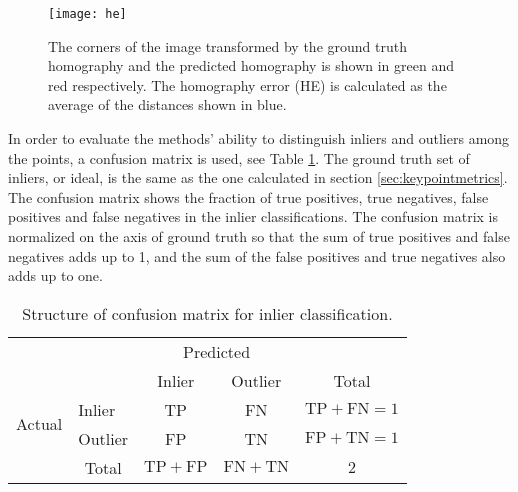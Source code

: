 \begin{figure}[H]
	\centering
	\texttt{[image: he]}
	\caption{The corners of the image transformed by the ground truth homography and the predicted homography is shown in green and red respectively. The homography error (HE) is calculated as the average of the distances shown in blue.}
	\label{fig:he}
\end{figure}

In order to evaluate the methods' ability to distinguish inliers and outliers among the points, a confusion matrix is used, see Table \ref{table:confusion}. The ground truth set of inliers, or ideal, is the same as the one calculated in section \ref{sec:keypointmetrics}. The confusion matrix shows the fraction of true positives, true negatives, false positives and false negatives in the inlier classifications. The confusion matrix is normalized on the axis of ground truth so that the sum of true positives and false negatives adds up to 1, and the sum of the false positives and true negatives also adds up to one.

\begin{table}[H]
	\centering
	\begin{tabular}{l|l|c|c|c}
		\multicolumn{2}{c}{}&\multicolumn{2}{c}{Predicted}&\\
		\cline{3-4}
		\multicolumn{2}{c|}{}&Inlier&Outlier&\multicolumn{1}{c}{Total}\\
		\cline{2-4}
		\multirow{2}{*}{Actual}& Inlier & TP & FN & $\mathrm{TP}+\mathrm{FN}=1$\\
		\cline{2-4}
		& Outlier & FP & TN & $\mathrm{FP}+\mathrm{TN}=1$\\
		\cline{2-4}
		\multicolumn{1}{c}{} & \multicolumn{1}{c}{Total} & \multicolumn{1}{c}{$\mathrm{TP}+\mathrm{FP}$} & \multicolumn{    1}{c}{$\mathrm{FN}+\mathrm{TN}$} & \multicolumn{1}{c}{$2$}\\
	\end{tabular}
	\caption{Structure of confusion matrix for inlier classification.}
	\label{table:confusion}
\end{table}
